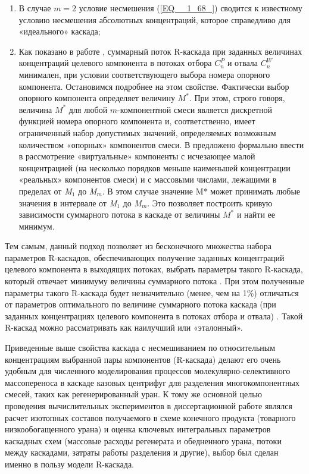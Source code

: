\begin{enumerate}
  \item В случае $m=2$ условие несмешения (\ref{EQ__1_68_}) сводится к известному условию несмешения абсолютных концентраций, которое справедливо для «идеального» каскада;
  \item	Как показано в работе \cite{songComparativeStudyModel2010}, суммарный поток R-каскада при заданных величинах концентраций целевого компонента в потоках отбора $C_{n}^{P}$ и отвала $C_{n}^{W}$ минимален, при условии соответствующего выбора номера опорного компонента. Остановимся подробнее на этом свойстве. Фактически выбор опорного компонента определяет величину $M^{*}$. При этом, строго говоря, величина $M^{*}$ для любой $m$-компонентной смеси является дискретной функцией номера опорного компонента и, соответственно, имеет ограниченный набор допустимых значений, определяемых возможным количеством «опорных» компонентов смеси. В \cite{sulaberidzeSravnenieOptimalnyhModelnyh2008} предложено формально ввести в рассмотрение «виртуальные» компоненты с исчезающее малой концентрацией (на несколько порядков меньше наименьшей концентрации «реальных» компонентов смеси) и с массовыми числами, лежащими в пределах от \textit{M${}_{1}$} до \textit{M${}_{m}$}. В этом случае значение M* может принимать любые значения в интервале от \textit{M${}_{1}$} до \textit{M${}_{m}$}. Это позволяет построить кривую зависимости суммарного потока в каскаде от величины $M^{*}$ и найти ее минимум. 
\end{enumerate}
  
Тем самым, данный подход позволяет из бесконечного множества набора параметров R-каскадов, обеспечивающих получение заданных концентраций целевого компонента в выходящих потоках, выбрать параметры такого R-каскада, который отвечает минимуму величины суммарного потока \cite{sulaberidzeSravnenieOptimalnyhModelnyh2008}. При этом полученные параметры такого R-каскада будет незначительно (менее, чем на 1\%) отличаться от параметров оптимального по величине суммарного потока каскада (при заданных концентрациях целевого компонента в потоках отбора и отвала) \cite{songComparativeStudyModel2010}. Такой R-каскад можно рассматривать как наилучший или «эталонный».

Приведенные выше свойства каскада с несмешиванием по относительным концентрациям выбранной пары компонентов (R-каскада) делают его очень удобным для численного моделирования процессов молекулярно-селективного массопереноса в каскаде казовых центрифуг для разделения многокомпонентных смесей, таких как регенерированный уран. К тому же основной целью проведения вычислительных экспериментов в диссертационной работе являлся расчет изотопных составов получаемого в схеме конечного продукта (товарного низкообогащенного урана) и оценка ключевых интегральных параметров каскадных схем (массовые расходы регенерата и обедненного урана, потоки между каскадами, затраты работы разделения и другие), выбор был сделан именно в пользу модели R-каскада. 

